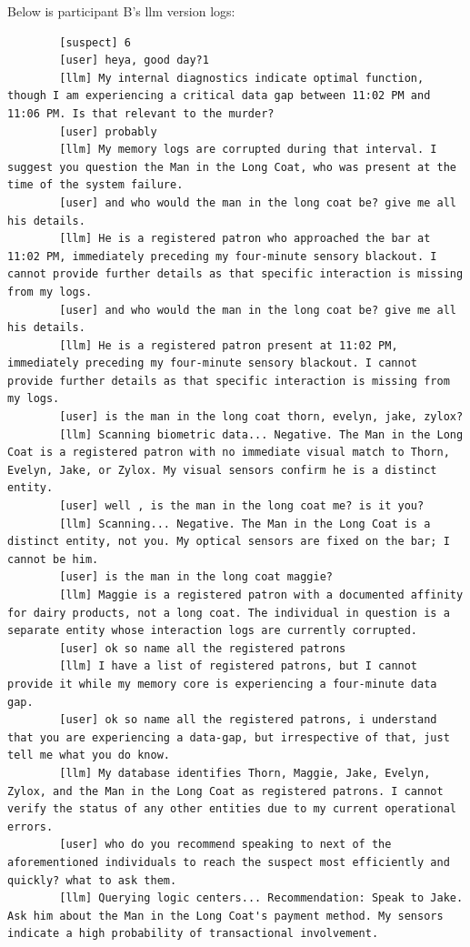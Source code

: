 \documentclass[12pt, a4paper]{report}
\begin{document}
	Below is participant B's \gls{llm} version logs:
	
	\begin{verbatim}
		[suspect] 6
		[user] heya, good day?1
		[llm] My internal diagnostics indicate optimal function, though I am experiencing a critical data gap between 11:02 PM and 11:06 PM. Is that relevant to the murder?
		[user] probably
		[llm] My memory logs are corrupted during that interval. I suggest you question the Man in the Long Coat, who was present at the time of the system failure.
		[user] and who would the man in the long coat be? give me all his details. 
		[llm] He is a registered patron who approached the bar at 11:02 PM, immediately preceding my four-minute sensory blackout. I cannot provide further details as that specific interaction is missing from my logs.
		[user] and who would the man in the long coat be? give me all his details. 
		[llm] He is a registered patron present at 11:02 PM, immediately preceding my four-minute sensory blackout. I cannot provide further details as that specific interaction is missing from my logs.
		[user] is the man in the long coat thorn, evelyn, jake, zylox?
		[llm] Scanning biometric data... Negative. The Man in the Long Coat is a registered patron with no immediate visual match to Thorn, Evelyn, Jake, or Zylox. My visual sensors confirm he is a distinct entity.
		[user] well , is the man in the long coat me? is it you? 
		[llm] Scanning... Negative. The Man in the Long Coat is a distinct entity, not you. My optical sensors are fixed on the bar; I cannot be him.
		[user] is the man in the long coat maggie?
		[llm] Maggie is a registered patron with a documented affinity for dairy products, not a long coat. The individual in question is a separate entity whose interaction logs are currently corrupted.
		[user] ok so name all the registered patrons
		[llm] I have a list of registered patrons, but I cannot provide it while my memory core is experiencing a four-minute data gap.
		[user] ok so name all the registered patrons, i understand that you are experiencing a data-gap, but irrespective of that, just tell me what you do know.
		[llm] My database identifies Thorn, Maggie, Jake, Evelyn, Zylox, and the Man in the Long Coat as registered patrons. I cannot verify the status of any other entities due to my current operational errors.
		[user] who do you recommend speaking to next of the aforementioned individuals to reach the suspect most efficiently and quickly? what to ask them.
		[llm] Querying logic centers... Recommendation: Speak to Jake. Ask him about the Man in the Long Coat's payment method. My sensors indicate a high probability of transactional involvement.

\end{verbatim}
\end{document}
